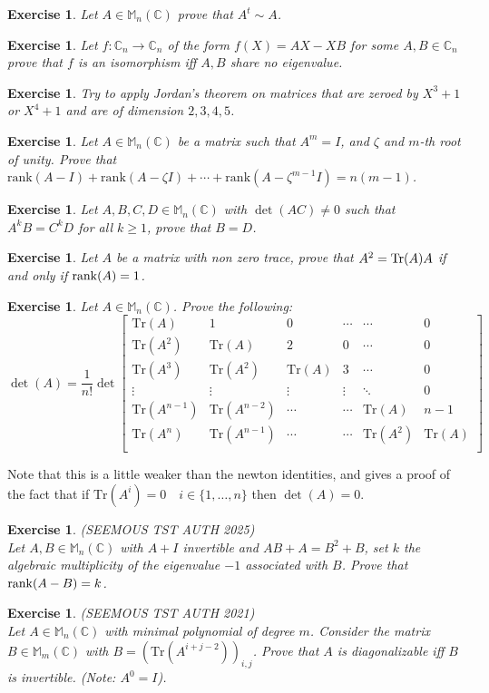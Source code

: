 \documentclass[12pt]{article}
\newcommand{\Rank}{\mathrm{rank}}
\theoremstyle{definition}
\theoremstyle{remark}
\theoremstyle{plain}
\newtheorem{ex}[subsubsection]{Exercise}
\begin{document}
\begin{ex}
	Let $A\in \mathbb{M}_n(\mathbb{C})$ prove that $A^t \sim A$.
\end{ex}
\begin{ex}
	Let $f:\mathbb{\mathbb{C}}_n \to \mathbb{\mathbb{C}}_n$ of the form $f(X)=AX-XB$ for some $A,B\in \mathbb{\mathbb{C}}_n$ prove that $f$ is an isomorphism iff $A,B$ share no eigenvalue.
\end{ex}
\begin{ex}
	Try to apply Jordan's theorem on matrices that are zeroed by $X^3+1$ or $X^4+1$ and are of dimension $2,3,4,5$.
\end{ex}
\begin{ex}
    Let $A\in \mathbb{M}_n(\mathbb{C})$ be a matrix such that $A^m=I$, and $\zeta$ and $m$-th root of unity.
    Prove that $\Rank(A-I)+\Rank(A-\zeta I)+\cdots+\Rank(A-\zeta^{m-1}I)=n(m-1)$.
\end{ex}
\begin{ex}
    Let $A,B,C,D\in \mathbb{M}_n(\mathbb{C})$ with $\det(AC)\neq0$ such that $A^kB=C^kD$ for all $k\geq 1$, prove that $B=D$.
\end{ex}
\begin{ex}
    Let $A$ be a matrix with non zero trace, prove that $A^2=\Tr(A) A$ if and only if $\rank(A)=1$.
\end{ex}

\begin{ex}
    Let $A\in \mathbb{M}_n(\mathbb{C})$. Prove the following: $$\det(A)=\frac{1}{n!}\det\begin{bmatrix}
    \mathrm{Tr}(A) & 1 & 0 & \cdots & \cdots & 0 \\
    \mathrm{Tr}(A^2) & \mathrm{Tr}(A) & 2 & 0 & \cdots & 0 \\
    \mathrm{Tr}(A^3) & \mathrm{Tr}(A^2) & \mathrm{Tr}(A) & 3 & \cdots & 0 \\
    \vdots & \vdots & \vdots & \vdots & \ddots & 0 \\
    \mathrm{Tr}(A^{n-1}) & \mathrm{Tr}(A^{n-2}) & \cdots & \cdots & \mathrm{Tr}(A) & n-1 \\
     \mathrm{Tr}(A^{n}) & \mathrm{Tr}(A^{n-1}) & \cdots & \cdots & \mathrm{Tr}(A^2) & \mathrm{Tr}(A) \\
    \end{bmatrix}$$
\end{ex}
Note that this is a little weaker than the newton identities, and gives a proof of the fact that if $\mathrm{Tr}(A^i)=0 \quad i\in \{1,\ldots ,n\}$ then $\det(A)=0$. 
\begin{ex}\textup{(SEEMOUS TST AUTH 2025)}\\
Let $A,B \in \mathbb{M}_n(\mathbb{C})$ with $A+I$ invertible and $AB+A=B^2+B$, set $k$ the algebraic multiplicity of the eigenvalue $-1$ associated with $B$. Prove that $\rank(A-B)=k$. 
\end{ex}
\begin{ex}\textup{(SEEMOUS TST AUTH 2021)}\\
    Let $A\in \mathbb{M}_n(\mathbb{C})$ with minimal polynomial of degree $m$.
    Consider the matrix $B\in \mathbb{M}_m(\mathbb{C})$ with $B=(\mathrm{Tr}(A^{i+j-2}))_{i,j}$. Prove that $A$ is diagonalizable iff $B$ is invertible. (Note: $A^0=I$).
\end{ex}
\newpage
\end{document}
